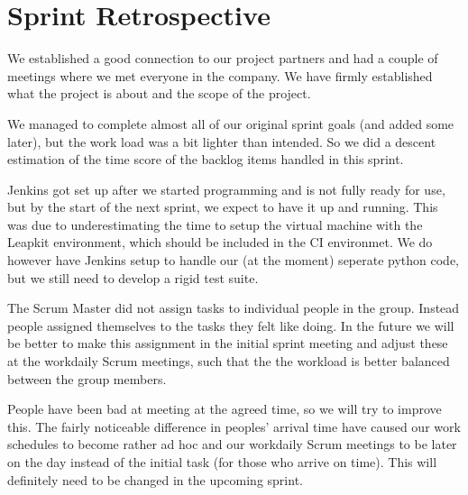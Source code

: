 \section{Sprint Retrospective}

We established a good connection to our project partners and had a
couple of meetings where we met everyone in the company. We have firmly
established what the project is about and the scope of the project.

We managed to complete almost all of our original sprint goals (and added some later), but the work load was a bit lighter than intended. So we did a descent estimation of the time score of the backlog items handled in this sprint.

Jenkins got set up after we started programming and is not fully ready for use, but by the start of the next sprint, we expect to have it up and running. This was due to underestimating the time to setup the virtual machine with the Leapkit environment, which should be included in the CI environmet. We do however have Jenkins setup to handle our (at the moment) seperate python code, but we still need to develop a rigid test suite.

The Scrum Master did not assign tasks to individual people in the group. Instead people assigned themselves to the tasks they felt like doing. In the future we will be better to make this assignment in the initial sprint meeting and adjust these at the workdaily Scrum meetings, such that the the workload is better balanced between the group members.

People have been bad at meeting at the agreed time, so we will try to improve this. The fairly noticeable difference in peoples' arrival time have caused our work schedules to become rather ad hoc and our workdaily Scrum meetings to be later on the day instead of the initial task (for those who arrive on time). This will definitely need to be changed in the upcoming sprint.
